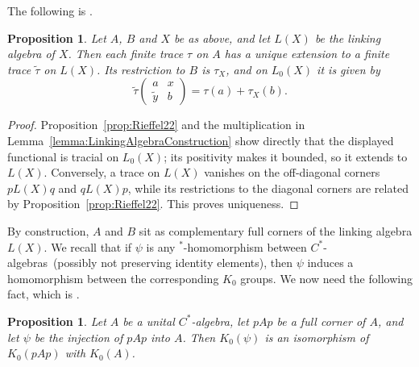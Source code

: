 \documentclass{book}
\newtheorem{proposition}[definition]{Proposition}
\def\cstar{\(C^*\)-algebra}
\def\cstars{\(C^*\)-algebras}
\begin{document}
The following is \cite[Proposition~2.3]{Rieffel1981}.
\begin{proposition}\label{prop:TraceLinkingAlgebra}
  Let \(A\), \(B\) and \(X\) be as above, and let \(L(X)\) be the linking
  algebra of \(X\). Then each finite trace \(\tau\) on \(A\) has a unique
  extension to a finite trace \(\widetilde\tau\) on \(L(X)\). Its restriction
  to \(B\) is \(\tau_X\), and on \(L_0(X)\) it is given by
  \[
    \widetilde\tau
    \begin{pmatrix}a&x\\ \widetilde y&b\end{pmatrix}
    =\tau(a)+\tau_X(b).
  \]
\end{proposition}
\begin{proof}
  Proposition~\ref{prop:Rieffel22} and the multiplication in
  Lemma~\ref{lemma:LinkingAlgebraConstruction} show directly that the displayed
  functional is tracial on \(L_0(X)\); its positivity makes it bounded, so it
  extends to \(L(X)\). Conversely, a trace on \(L(X)\) vanishes on the
  off-diagonal corners \(pL(X)q\) and \(qL(X)p\), while its restrictions to
  the diagonal corners are related by Proposition~\ref{prop:Rieffel22}. This
  proves uniqueness.
\end{proof}
By construction, \(A\) and \(B\) sit as complementary full corners of the
linking algebra \(L(X)\). We recall that if \(\psi\) is any
\(^*\)-homomorphism between \cstars\ (possibly not preserving identity
elements), then \(\psi\) induces a homomorphism between the corresponding
\(K_0\) groups. We now need the following fact, which is
\cite[Proposition~2.4]{Rieffel1981}.
\begin{proposition}\label{prop:K0FullCorner}
  Let \(A\) be a unital \cstar, let \(pAp\) be a full corner of \(A\), and let \(\psi\) be the 
  injection of \(pAp\) into \(A\). Then \(K_0(\psi)\) is an isomorphism of 
  \(K_0(pAp)\) with \(K_0(A)\).
\end{proposition}
\end{document}
